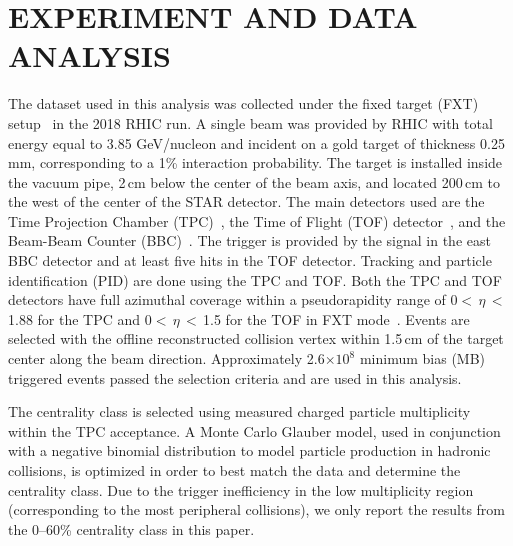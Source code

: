 \documentclass[aps,tightenlines,superscriptaddress,twocolumn]{revtex4-1}
\begin{document}
\section{EXPERIMENT AND DATA ANALYSIS }
\label{dataanalysis}

The dataset used in this analysis
was collected under the fixed target (FXT) setup~\cite{Meehan_2016} in the 2018 RHIC run. 
A single beam was provided by RHIC with total energy equal to 3.85 GeV/nucleon and incident on a gold target of thickness 0.25 mm, corresponding to a 1\% interaction probability.
The target is installed inside the vacuum pipe, 2\,cm below the center of the beam axis, and located 200\,cm to the west of the center of the STAR detector. The main detectors used are the Time Projection Chamber (TPC)~\cite{TPC}, the Time of Flight (TOF) detector~\cite{TOF}, and the Beam-Beam Counter (BBC)~\cite{BBC_Whitten}. The trigger is provided by the signal in the east BBC detector and at least five hits in the TOF detector. Tracking and particle identification (PID) are done using the TPC and TOF. Both the TPC and TOF detectors have full azimuthal coverage within a pseudorapidity range of 0$<$\,$\eta$\,$<$\,1.88 for the TPC and 0$<$\,$\eta$\,$<$\,1.5 for the TOF in FXT mode~\cite{TPC,TOF}. Events are selected with the offline reconstructed collision vertex within 1.5\,cm of the target center along the beam direction. Approximately 2.6$\times 10^{8}$ minimum bias (MB) triggered events passed the selection criteria and are used in this analysis. 

The centrality class is selected using measured charged particle multiplicity within the TPC acceptance. 
A Monte Carlo Glauber model, used in conjunction with a negative binomial distribution to model particle production in hadronic collisions, is optimized in order to best match the data and determine the centrality class. Due to the trigger inefficiency in the low multiplicity region (corresponding to the most peripheral collisions), we only report the results from the 0--60\% %
centrality class in this paper.
\end{document}
